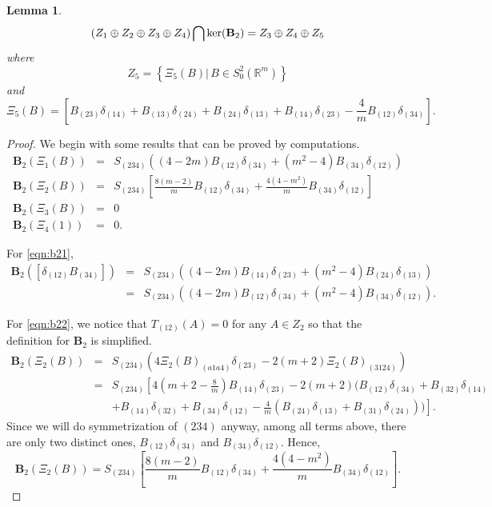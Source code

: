 \documentclass{amsart}
\newtheorem{lem}[thm]{Lemma}
\newcommand{\set}[1]{\left\{#1\right\}}
\newcommand{\Real}{\mathbb R}
\numberwithin{equation}{section}
\begin{document}
\begin{lem}
	\label{lem:computeB2}
	\[
		(Z_1\oplus Z_2\oplus Z_3\oplus Z_4) \bigcap {\rm ker}({\mathbf B}_2)= Z_3\oplus Z_4\oplus Z_5 
	\]
	where
	\[
		Z_5= \set{\Xi_5(B)|\, B\in S_0^2(\Real^m)}
	\]
	and
	\[
		\Xi_5(B)= [B_{(23)}\delta_{(14)}+ B_{(13)}\delta_{(24)}+B_{(24)}\delta_{(13)}+B_{(14)}\delta_{(23)}-\frac{4}{m} B_{(12)}\delta_{(34)}].
	\]
\end{lem}
\begin{proof}
	We begin with some results that can be proved by computations.
	\begin{eqnarray}
		\label{eqn:b21}
		{\mathbf B}_2( \Xi_1(B))&=& S_{(234)}\left( (4-2m) B_{(12)}\delta_{(34)} + (m^2-4)B_{(34)}\delta_{(12)} \right) \\
		\label{eqn:b22}
		{\mathbf B}_2(\Xi_2(B)) &=& S_{(234)} [\frac{8(m-2)}{m}B_{(12)}\delta_{(34)} + \frac{4(4-m^2)}{m}B_{(34)}\delta_{(12)}] \\
		\label{eqn:b23}
		{\mathbf B}_2(\Xi_3(B)) &=& 0 \\
		\label{eqn:b24}
		{\mathbf B}_2(\Xi_4(1)) &=& 0.
	\end{eqnarray}

	For \eqref{eqn:b21},
	\begin{eqnarray*}
		{\mathbf B}_2( [\delta_{(12)}B_{(34)}])&=& S_{(234)}\left( (4-2m) B_{(14)}\delta_{(23)} + (m^2-4)B_{(24)}\delta_{(13)} \right)\\
						       &=& S_{(234)}\left( (4-2m) B_{(12)}\delta_{(34)} + (m^2-4)B_{(34)}\delta_{(12)} \right).
	\end{eqnarray*}

	For \eqref{eqn:b22}, we notice that $T_{(12)}(A)=0$ for any $A\in Z_2$ so that the definition for ${\mathbf B}_2$ is simplified.
	\begin{eqnarray*}
		{\mathbf B}_2( \Xi_2(B)) &=& S_{(234)} (4 \Xi_2(B)_{(a1a4)}\delta_{(23)} - 2(m+2) \Xi_2(B)_{(3124)}) \\
					 &=& S_{(234)}\left[ 4(m+2-\frac{8}{m})B_{(14)}\delta_{(23)} -2(m+2)( B_{(12)}\delta_{(34)}+B_{(32)}\delta_{(14)}\right. \\
					 && \left. +B_{(14)}\delta_{(32)}+B_{(34)}\delta_{(12)} -\frac{4}{m}(B_{(24)}\delta_{(13)}+B_{(31)}\delta_{(24)})) \right].
	\end{eqnarray*}
	Since we will do symmetrization of $(234)$ anyway, among all terms above, there are only two distinct ones, $B_{(12)}\delta_{(34)}$ and $B_{(34)}\delta_{(12)}$. Hence,
	\[
		{\mathbf B}_2(\Xi_2(B)) = S_{(234)} [\frac{8(m-2)}{m}B_{(12)}\delta_{(34)} + \frac{4(4-m^2)}{m}B_{(34)}\delta_{(12)}].
	\]


\end{proof}
\end{document}
